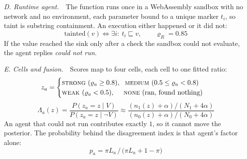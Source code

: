 \documentclass[conference,10pt]{IEEEtran}
\newcommand{\LRr}{\Lambda}
\begin{document}
\smallskip\noindent\textit{D. Runtime agent.}\ \ The function runs once in a WebAssembly sandbox with
no network and no environment, each parameter bound to a unique marker $t_i$, so taint is substring
containment. An execution either happened or it did not:
\begin{equation}
\mathrm{tainted}(v)\iff \exists i:\ t_i \sqsubseteq v, \qquad \varrho_R = 0.85
\end{equation}
If the value reached the sink only after a check the sandbox could not evaluate, the agent replies
\emph{could not run}.

\smallskip\noindent\textit{E. Cells and fusion.}\ \ Scores map to four cells, each cell to one fitted
ratio:
\begin{equation}
z_a=\begin{cases}
\textsc{strong}\ (\varrho_a \ge 0.8), \ \ \textsc{medium}\ (0.5 \le \varrho_a < 0.8)\\
\textsc{weak}\ (\varrho_a < 0.5), \ \ \ \ \textsc{none}\ (\text{ran, found nothing})
\end{cases}
\end{equation}
\begin{equation}
\LRr_a(z)=\frac{P(z_a\!=\!z \mid V)}{P(z_a\!=\!z \mid \neg V)}
\approx\frac{(n_1(z)+\alpha)/(N_1+4\alpha)}{(n_0(z)+\alpha)/(N_0+4\alpha)}
\end{equation}
An agent that could not run contributes exactly $1$, so it cannot move the posterior. The probability
behind the disagreement index is that agent's factor alone:
\begin{equation}
p_a=\pi L_a \,/\, \bigl(\pi L_a + 1 - \pi\bigr)
\end{equation}
\end{document}
